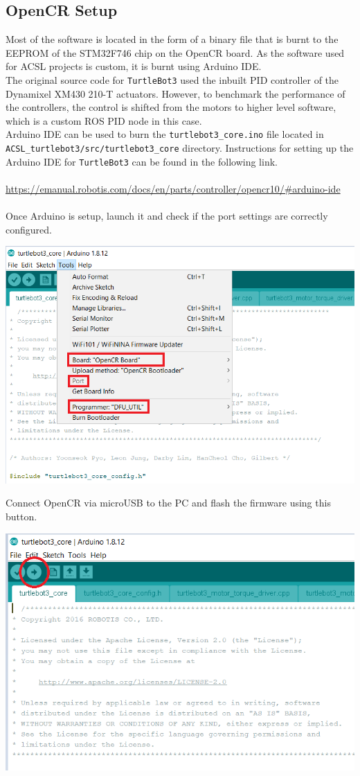 \documentclass[12]{article}
\begin{document}
\subsection{OpenCR Setup}
Most of the software is located in the form of a binary file that is burnt to the EEPROM of the STM32F746 chip on the OpenCR board. As the software used for ACSL projects is custom, it is burnt using Arduino IDE.\\
The original source code for \texttt{TurtleBot3} used the inbuilt PID controller of the Dynamixel XM430 210-T actuators. However, to benchmark the performance of the controllers, the control is shifted from the motors to higher level software, which is a custom ROS PID node in this case.\\
Arduino IDE can be used to burn the \texttt{turtlebot3\_core.ino} file located in \texttt{ACSL\_turtlebot3/src/turtlebot3\_core} directory. Instructions for setting up the Arduino IDE for \texttt{TurtleBot3} can be found in the following link.\\\\
\url {https://emanual.robotis.com/docs/en/parts/controller/opencr10/#arduino-ide}\\\\
Once Arduino is setup, launch it and check if the port settings are correctly configured.
\begin{center}
	\includegraphics[width=0.5\linewidth]{images/arduino_setup.png}\\
\end{center}
Connect OpenCR via microUSB to the PC and flash the firmware using this button.\\
\begin{center}
	\includegraphics[width=0.5\linewidth]{images/arduino_flash.png}\\
\end{center}
\newpage
\end{document}
